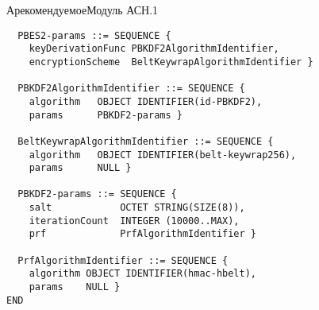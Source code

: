 \begin{appendix}{А}{рекомендуемое}{Модуль АСН.1}
\begin{verbatim}
  PBES2-params ::= SEQUENCE {
    keyDerivationFunc PBKDF2AlgorithmIdentifier,
    encryptionScheme  BeltKeywrapAlgorithmIdentifier }
  
  PBKDF2AlgorithmIdentifier ::= SEQUENCE {
    algorithm   OBJECT IDENTIFIER(id-PBKDF2),
    params      PBKDF2-params }
  
  BeltKeywrapAlgorithmIdentifier ::= SEQUENCE {
    algorithm   OBJECT IDENTIFIER(belt-keywrap256),
    params      NULL }

  PBKDF2-params ::= SEQUENCE {
    salt            OCTET STRING(SIZE(8)),
    iterationCount  INTEGER (10000..MAX),
    prf             PrfAlgorithmIdentifier }
  
  PrfAlgorithmIdentifier ::= SEQUENCE {
    algorithm OBJECT IDENTIFIER(hmac-hbelt), 
    params    NULL }
END
\end{verbatim}

\end{appendix}
  